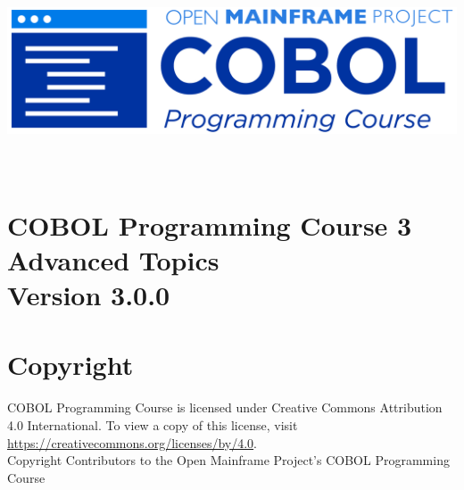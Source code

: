 \begin{center}
  \vspace*{25pt}
\includegraphics{Images/COBOL-Programming-Course.png}
\hypertarget{cobol-programming-course-3}{%
\section*{
  \\[35pt]
  \Huge COBOL Programming Course 3 \\[10pt]
  \Huge Advanced Topics \\[15pt]
  \Large Version 3.0.0}\label{cobol-programming-course-3}}
\end{center}

\pagebreak
\hypertarget{copyright}{%
\section*{Copyright}{
  \normalsize COBOL Programming Course is licensed under Creative Commons 
  Attribution 4.0 International. To view a copy of this license, visit 
  \href{https://creativecommons.org/licenses/by/4.0}{https://creativecommons.org/licenses/by/4.0}. \\[10pt]
  Copyright Contributors to the Open Mainframe Project's COBOL Programming Course}\label{copyright}}
\pagebreak
